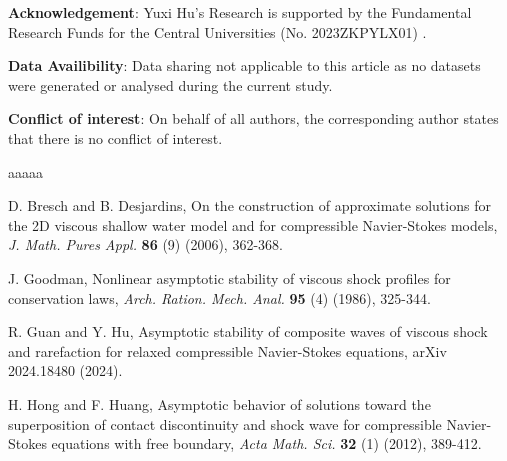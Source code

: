 \documentclass[10pt,reqno]{amsart}
\numberwithin{equation}{section}
\begin{document}
\textbf{Acknowledgement}: Yuxi Hu's Research is supported by the Fundamental Research Funds for the Central Universities (No. 2023ZKPYLX01) .

\textbf{Data Availibility}:  Data sharing not applicable to this article as no datasets were generated or analysed during the current study.

\textbf{Conflict of interest}: On behalf of all authors, the corresponding author states that there is no conflict of interest.


\begin{thebibliography}{aaaaa}

 D. Bresch and B. Desjardins, On the construction of approximate solutions for the 2D viscous shallow water model and for compressible Navier-Stokes models, {\it J. Math. Pures Appl.} {\bf 86 }(9) (2006), 362-368.






 J. Goodman, Nonlinear asymptotic stability of viscous shock profiles for conservation laws, {\it Arch. Ration. Mech. Anal. }{\bf 95} (4) (1986), 325-344.


 {R. Guan and Y. Hu, Asymptotic stability of composite waves of viscous shock and rarefaction  for relaxed compressible Navier-Stokes equations, arXiv 2024.18480 (2024).}


     H. Hong and F. Huang, Asymptotic behavior of solutions toward the superposition of contact discontinuity and shock wave for compressible Navier-Stokes equations with free boundary, {\it Acta Math. Sci. } {\bf 32} (1) (2012), 389-412.


\end{thebibliography}
\end{document}
